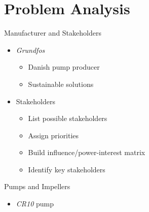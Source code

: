 \section{Problem Analysis}

\begin{frame}{Manufacturer and Stakeholders}
\begin{itemize}
    \item \textit{Grundfos}
    \begin{itemize}
        \item Danish pump producer
        \item Sustainable solutions
    \end{itemize}

    \item Stakeholders
    \begin{itemize}
        \item List possible stakeholders
        \item Assign priorities
        \item Build influence/power-interest matrix
        \item Identify key stakeholders
    \end{itemize}
\end{itemize}

\end{frame}


\begin{frame}{Pumps and Impellers}
\begin{itemize}
    \item \textit{CR10} pump
\end{itemize}

\end{frame}


